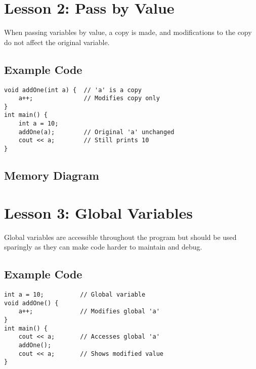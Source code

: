 \documentclass{article}
\begin{document}
\section{Lesson 2: Pass by Value}

\begin{conceptbox}
When passing variables by value, a copy is made, and modifications to the copy do not affect the original variable.
\end{conceptbox}

\subsection{Example Code}
\begin{lstlisting}
void addOne(int a) {  // 'a' is a copy
    a++;              // Modifies copy only
}
int main() {
    int a = 10;
    addOne(a);        // Original 'a' unchanged
    cout << a;        // Still prints 10
}
\end{lstlisting}

\subsection{Memory Diagram}
\begin{center}
\end{center}

\section{Lesson 3: Global Variables}

\begin{warningbox}
Global variables are accessible throughout the program but should be used sparingly as they can make code harder to maintain and debug.
\end{warningbox}

\subsection{Example Code}
\begin{lstlisting}
int a = 10;          // Global variable
void addOne() {
    a++;             // Modifies global 'a'
}
int main() {
    cout << a;       // Accesses global 'a'
    addOne();
    cout << a;       // Shows modified value
}
\end{lstlisting}
\end{document}
